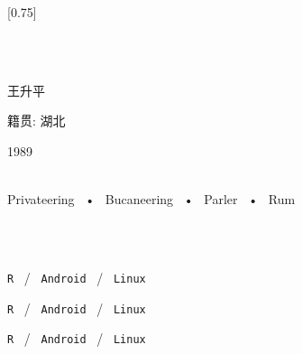 \documentclass[lighthipster]{simplehipstercv}
\begin{document}
	\setlength{\columnsep}{1.5cm}
	[0.75]
	\begin{paracol}{2}
		
		\paracolbackgroundoptions
		
		
		
		\footnotesize
		{\setasidefontcolour
			\flushright
			\begin{center}
			\end{center}
			
			\\[0.5em]
			
			{\footnotesize
				\lorem\lorem\lorem}
			\bigskip
			
			 \\[0.5em]
			王升平
			
			籍贯: 湖北 
			
			1989
			
			\bigskip
			
			 \\[0.5em]
			
			Privateering ~•~ Bucaneering ~•~ Parler ~•~ Rum
			
			\bigskip
			
			
			
			\bigskip
			
			\\[0.5em]
			
			\lorem
			\bigskip
			
			\\[0.5em]
			
			\texttt{R} ~/~ \texttt{Android} ~/~ \texttt{Linux}
			
			\texttt{R} ~/~ \texttt{Android} ~/~ \texttt{Linux}
			
			\texttt{R} ~/~ \texttt{Android} ~/~ \texttt{Linux}
			
			\vspace{4em}
			
			
			\phantom{turn the page}
			
			\phantom{turn the page}
		}
		\switchcolumn
		

\end{paracol}
\end{document}
